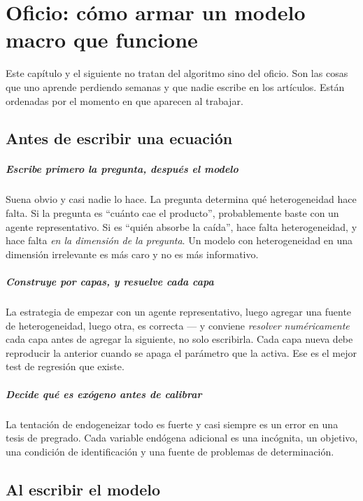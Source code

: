 \chapter{Oficio: cómo armar un modelo macro que funcione}
\label{cap:tips}

Este capítulo y el siguiente no tratan del algoritmo sino del oficio. Son las
cosas que uno aprende perdiendo semanas y que nadie escribe en los artículos.
Están ordenadas por el momento en que aparecen al trabajar.

\section{Antes de escribir una ecuación}

\paragraph{Escribe primero la pregunta, después el modelo} Suena obvio y casi
nadie lo hace. La pregunta determina qué heterogeneidad hace falta. Si la
pregunta es ``cuánto cae el producto'', probablemente baste con un agente
representativo. Si es ``quién absorbe la caída'', hace falta heterogeneidad, y
hace falta \emph{en la dimensión de la pregunta}. Un modelo con heterogeneidad
en una dimensión irrelevante es más caro y no es más informativo.

\paragraph{Construye por capas, y resuelve cada capa} La estrategia de empezar
con un agente representativo, luego agregar una fuente de heterogeneidad, luego
otra, es correcta --- y conviene \emph{resolver numéricamente} cada capa antes de
agregar la siguiente, no solo escribirla. Cada capa nueva debe reproducir la
anterior cuando se apaga el parámetro que la activa. Ese es el mejor test de
regresión que existe.

\paragraph{Decide qué es exógeno antes de calibrar} La tentación de endogeneizar
todo es fuerte y casi siempre es un error en una tesis de pregrado. Cada variable
endógena adicional es una incógnita, un objetivo, una condición de identificación
y una fuente de problemas de determinación.

\section{Al escribir el modelo}

